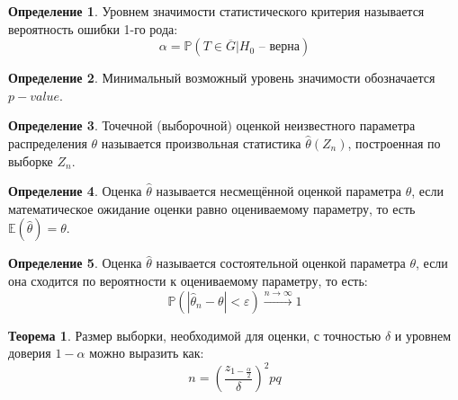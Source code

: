 \documentclass[12pt]{article}
\theoremstyle{definition}
\newtheorem{theorem}{Теорема}[section]
\newtheorem{definition}{Определение}
\newcommand{\E}{\mathbb{E}}
\newcommand{\prob}{\mathbb{P}}
\begin{document}
\begin{definition}
    Уровнем значимости статистического критерия называется вероятность ошибки 1-го рода:
    $$\alpha=\prob(T\in \overline{G}|H_0\text{ – верна})$$
\end{definition}
\begin{definition}
    Минимальный возможный уровень значимости обозначается $p-value$.
\end{definition}
\begin{definition}
    Точечной (выборочной) оценкой неизвестного параметра распределения $\theta$ называется произвольная статистика $\hat{\theta}(Z_n)$, построенная по выборке $Z_n$.
\end{definition}
\begin{definition}
    Оценка $\hat{\theta}$ называется несмещённой оценкой параметра $\theta$, если математическое ожидание оценки равно оцениваемому параметру, то есть $\E(\hat{\theta})=\theta$.
\end{definition}
\begin{definition}
    Оценка $\hat{\theta}$ называется состоятельной оценкой параметра $\theta$, если она сходится по вероятности к оцениваемому параметру, то есть:
    $$\prob(|\hat{\theta}_n-\theta|<\varepsilon)\xrightarrow{n\to\infty}1$$
\end{definition}
\begin{theorem}
    Размер выборки, необходимой для оценки, с точностью $\delta$ и уровнем доверия $1-\alpha$ можно выразить как:
    $$n=\left(\frac{z_{1-\frac{\alpha}{2}}}{\delta}\right)^2pq$$
\end{theorem}
\end{document}
